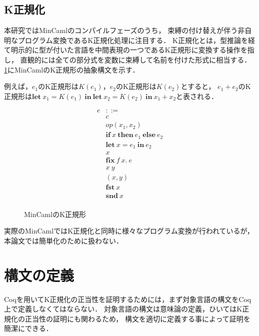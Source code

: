 \documentclass[T]{compsoft}
\newcommand{\keyword}[1]{\mathbf{#1}}
\newcommand{\IF}{\keyword{if}}
\newcommand{\THEN}{\keyword{then}}
\newcommand{\ELSE}{\keyword{else}}
\newcommand{\LET}{\keyword{let}}
\newcommand{\FIX}{\keyword{fix}}
\newcommand{\IN}{\keyword{in}}
\newcommand{\FST}{\keyword{fst}}
\newcommand{\SND}{\keyword{snd}}
\begin{document}
\subsection{K正規化}
本研究ではMinCamlのコンパイルフェーズのうち，
束縛の付け替えが伴う非自明なプログラム変換であるK正規化処理に注目する．
K正規化とは，型推論を経て明示的に型が付いた言語を中間表現の一つであるK正規形\cite{Birkedal:1996:RIV:237721.237771}に変換する操作を指し，
直観的には全ての部分式を変数に束縛して名前を付けた形式に相当する．
\figurename\ref{eqn:mincaml-knormal}にMinCamlのK正規形の抽象構文を示す．

例えば，$e_1$のK正規形は$K(e_1)$，$e_2$のK正規形は$K(e_2)$とすると，
$e_1+e_2$のK正規形は$\LET~x_1=K(e_1)~\IN~\LET~x_2=K(e_2)~\IN~x_1+x_2$と表される．

\begin{figure}[htbp]
	\[ \begin{array}{ll}
			e & ::= \\
				& c \\
				& \textit{op}(x_1,x_2) \\
				& \IF~x~\THEN~e_1~\ELSE~e_2 \\
			 	& \LET~x=e_1~\IN~e_2 \\
				& x \\
				& \FIX~f~x.~e \\
				& x~y \\
				& (x,y) \\
				& \FST~x \\
				& \SND~x \\
	\end{array} \]
	\caption{MinCamlのK正規形}
	\label{eqn:mincaml-knormal}
\end{figure}

実際のMinCamlではK正規化と同時に様々なプログラム変換が行われているが，
本論文では簡単化のために扱わない．

\section{構文の定義}
Coqを用いてK正規化の正当性を証明するためには，まず対象言語の構文をCoq上で定義しなくてはならない．
対象言語の構文は意味論の定義，ひいてはK正規化の正当性の証明にも関わるため，
構文を適切に定義する事によって証明を簡潔にできる．
\end{document}
